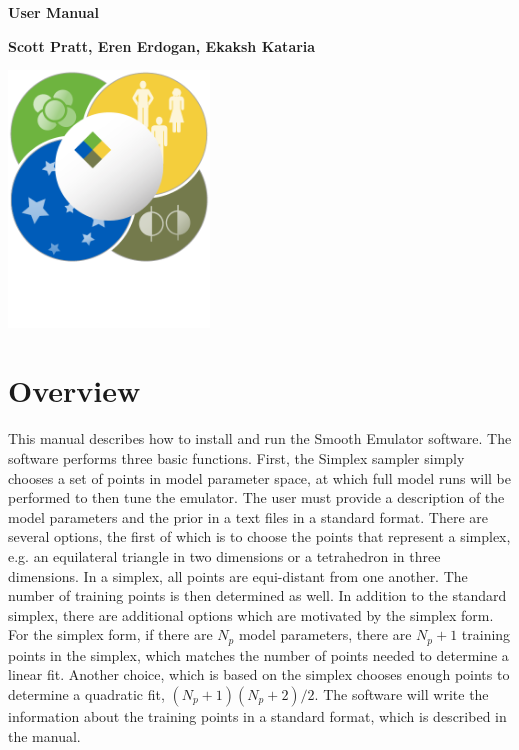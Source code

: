 \documentclass[12pt]{article}
\numberwithin{equation}{section}
\numberwithin{figure}{section}
\begin{document}
\begin{titlepage}
   \begin{center}
       \vspace*{1cm}

       \textbf{User Manual}

       \vspace{2.0cm}

       \textbf{Scott Pratt, Eren Erdogan, Ekaksh Kataria}
       
       \vfill
            
       \vspace{0.8cm}
     
       \includegraphics[width=0.4\textwidth]{FRIB_logo.png}
            
            
   \end{center}
\end{titlepage}

\tableofcontents

\newpage


\section{Overview}



This manual describes how to install and run the Smooth Emulator software. The software performs three basic functions. First, the Simplex sampler simply chooses a set of points in model parameter space, at which full model runs will be performed to then tune the emulator. The user must provide a description of the model parameters and the prior in a text files in a standard format. There are several options, the first of which is to choose the points that represent a simplex, e.g. an equilateral triangle in two dimensions or a tetrahedron in three dimensions. In a simplex, all points are equi-distant from one another.  The number of training points is then determined as well. In addition to the standard simplex, there are additional options which are motivated by the simplex form. For the simplex form, if there are $N_p$ model parameters, there are $N_p+1$ training points in the simplex, which matches the number of points needed to determine a linear fit. Another choice, which is based on the simplex chooses enough points to determine a quadratic fit, $(N_p+1)(N_p+2)/2$. The software will write the information about the training points in a standard format, which is described in the manual.
\end{document}
